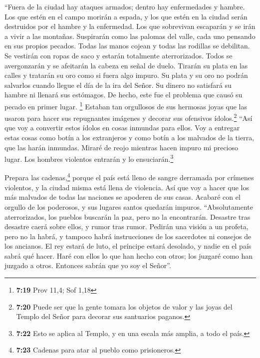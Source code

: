  ``Fuera de la ciudad hay ataques armados; dentro hay
enfermedades y hambre. Los que estén en el campo morirán a espada, y los
que estén en la ciudad serán destruidos por el hambre y la enfermedad.
 Los que sobrevivan escaparán y se irán a vivir a las
montañas. Suspirarán como las palomas del valle, cada uno pensando en
sus propios pecados.  Todas las manos cojean y todas las
rodillas se debilitan.  Se vestirán con ropas de saco y
estarán totalmente aterrorizados. Todos se avergonzarán y se afeitarán
la cabeza en señal de duelo.  Tirarán su plata en las
calles y tratarán su oro como si fuera algo impuro. Su plata y su oro no
podrán salvarlos cuando llegue el día de la ira del Señor. Su dinero no
satisfará su hambre ni llenará sus estómagos. De hecho, este fue el
problema que causó su pecado en primer lugar. \footnote{\textbf{7:19}
  Prov 11,4; Sof 1,18}  Estaban tan orgullosos de sus
hermosas joyas que las usaron para hacer sus repugnantes imágenes y
decorar sus ofensivos ídolos.\footnote{\textbf{7:20} Puede ser que la
  gente tomara los objetos de valor y las joyas del Templo del Señor
  para decorar sus santuarios paganos.} ``Así que voy a convertir estos
ídolos en cosas inmundas para ellos.  Voy a entregar
estas cosas como botín a los extranjeros y como botín a los malvados de
la tierra, que las harán inmundas.  Miraré de reojo
mientras hacen impuro mi precioso lugar. Los hombres violentos entrarán
y lo ensuciarán.\footnote{\textbf{7:22} Esto se aplica al Templo, y en
  una escala más amplia, a todo el país.}

 Prepara las cadenas,\footnote{\textbf{7:23} Cadenas para
  atar al pueblo como prisioneros.} porque el país está lleno de sangre
derramada por crímenes violentos, y la ciudad misma está llena de
violencia.  Así que voy a hacer que los más malvados de
todas las naciones se apoderen de sus casas. Acabaré con el orgullo de
los poderosos, y sus lugares santos quedarán impuros. 
``Absolutamente aterrorizados, los pueblos buscarán la paz, pero no la
encontrarán.  Desastre tras desastre caerá sobre ellos, y
rumor tras rumor. Pedirán una visión a un profeta, pero no la habrá, y
tampoco habrá instrucciones de los sacerdotes ni consejos de los
ancianos.  El rey estará de luto, el príncipe estará
desolado, y nadie en el país sabrá qué hacer. Haré con ellos lo que han
hecho con otros; los juzgaré como han juzgado a otros. Entonces sabrán
que yo soy el Señor''.

